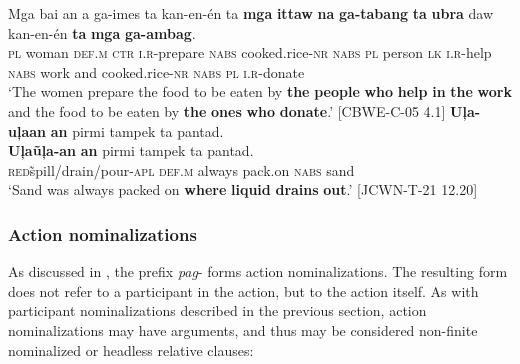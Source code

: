  \gll Mga  bai  an  a  ga-imes  ta  kan-en-én  ta \textbf{mga}  \textbf{ittaw}  \textbf{na}  \textbf{ga-tabang}  \textbf{ta}  \textbf{ubra}  daw  kan-en-én  \textbf{ta}  \textbf{mga}  \textbf{ga-ambag}. \\
\textsc{pl}  woman  \textsc{def.m}  \textsc{ctr}  \textsc{i.r-}prepare  \textsc{nabs}  cooked.rice-\textsc{nr}  \textsc{nabs} \textsc{pl}  person  \textsc{lk}  \textsc{i.r}-help  \textsc{nabs}  work  and  cooked.rice-\textsc{nr}  \textsc{nabs}  \textsc{pl}  \textsc{i.r}-donate \\
\glt `The women prepare the food to be eaten by \textbf{the} \textbf{people} \textbf{who} \textbf{help} \textbf{in} \textbf{the} \textbf{work} and the food to be eaten by \textbf{the} \textbf{ones} \textbf{who} \textbf{donate}.’ [CBWE-C-05 4.1]
\z
\ea
\label{bkm:Ref363550595}
\textbf{Uļa-uļaan}  \textbf{an}  pirmi  tampek  ta    pantad. \\\smallskip
 \gll \textbf{Uļa\~uļa-an}  \textbf{an}  pirmi  tampek  ta    pantad. \\
\textsc{red}\~spill/drain/pour-\textsc{apl}  \textsc{def.m}  always  pack.on  \textsc{nabs}  sand \\
\glt ‘Sand was always packed on \textbf{where} \textbf{liquid} \textbf{drains} \textbf{out}.’ [JCWN-T-21 12.20]
\z
\subsubsection{Action nominalizations}
\label{sec:actionnominalizations}

As discussed in , the prefix \textit{pag}{}- forms action nominalizations. The resulting form does not refer to a participant in the action, but to the action itself. As with participant nominalizations described in the previous section, action nominalizations may have arguments, and thus may be considered non-finite nominalized or headless relative clauses:

